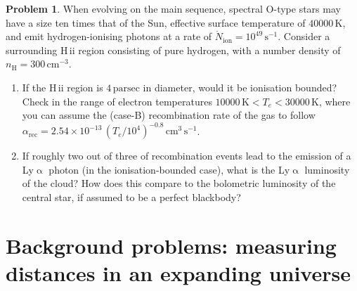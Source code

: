\documentclass{article}
\newcommand{\Lya}{{Ly\ensuremath{\upalpha}}\xspace}
\newcommand{\HII}{\hbox{H\,{\sc ii}}\xspace}
\theoremstyle{definition}
\newtheorem{problem}{Problem}[section]
\begin{document}
\begin{problem}
    \label{prob:HII_region}
    When evolving on the main sequence, spectral O-type stars may have a size ten times that of the Sun, effective surface temperature of $\num{40000} \, \mathrm{K}$, and emit hydrogen-ionising photons at a rate of $\dot{N}_\text{ion} = 10^{49} \, \mathrm{s^{-1}}$. Consider a surrounding \HII region consisting of pure hydrogen, with a number density of $n_\mathrm{H} = 300 \, \mathrm{cm^{-3}}$.
    \begin{enumerate}[label=(\alph*)]
        \item If the \HII region is $4 \, \mathrm{parsec}$ in diameter, would it be ionisation bounded? Check in the range of electron temperatures $\num{10000} \, \mathrm{K} < T_e < \num{30000} \, \mathrm{K}$, where you can assume the (case-B) recombination rate of the gas to follow $\alpha_\text{rec} = 2.54 \times 10^{-13} \, (T_e/10^4)^{-0.8} \, \mathrm{cm^3 \, s^{-1}}$.
        \item If roughly two out of three of recombination events lead to the emission of a \Lya photon (in the ionisation-bounded case), what is the \Lya luminosity of the cloud? How does this compare to the bolometric luminosity of the central star, if assumed to be a perfect blackbody?
    \end{enumerate}
\end{problem}

\section{Background problems: measuring distances in an expanding universe}
\end{document}
